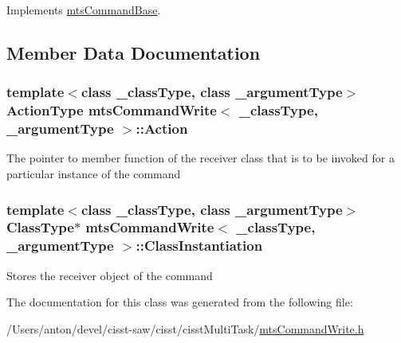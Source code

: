 Implements \hyperlink{classmts_command_base_a0885ce7a5321d7b672694ade780b9d64}{mts\+Command\+Base}.



\subsection{Member Data Documentation}
\hypertarget{classmts_command_write_affee375369797c3ffb3aba6578d33b23}{}
\subsubsection[{Action}]{\setlength{\rightskip}{0pt plus 5cm}template$<$class \+\_\+class\+Type, class \+\_\+argument\+Type$>$ {\bf Action\+Type} {\bf mts\+Command\+Write}$<$ \+\_\+class\+Type, \+\_\+argument\+Type $>$\+::Action\hspace{0.3cm}{\ttfamily [protected]}}\label{classmts_command_write_affee375369797c3ffb3aba6578d33b23}
The pointer to member function of the receiver class that is to be invoked for a particular instance of the command \hypertarget{classmts_command_write_accc06c909f9145a73c5e56ea64e08872}{}
\subsubsection[{Class\+Instantiation}]{\setlength{\rightskip}{0pt plus 5cm}template$<$class \+\_\+class\+Type, class \+\_\+argument\+Type$>$ {\bf Class\+Type}$\ast$ {\bf mts\+Command\+Write}$<$ \+\_\+class\+Type, \+\_\+argument\+Type $>$\+::Class\+Instantiation\hspace{0.3cm}{\ttfamily [protected]}}\label{classmts_command_write_accc06c909f9145a73c5e56ea64e08872}
Stores the receiver object of the command 

The documentation for this class was generated from the following file\+:\begin{DoxyCompactItemize}
\item 
/\+Users/anton/devel/cisst-\/saw/cisst/cisst\+Multi\+Task/\hyperlink{mts_command_write_8h}{mts\+Command\+Write.\+h}\end{DoxyCompactItemize}
